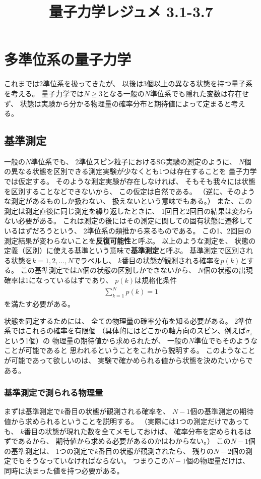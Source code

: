 \documentclass[a4paper, 10pt]{jsarticle}
\title{量子力学レジュメ 3.1-3.7}
\author{}
\begin{document}
\maketitle

\setcounter{section}{2}

\section{多準位系の量子力学}
これまでは2準位系を扱ってきたが、
以後は3個以上の異なる状態を持つ量子系を考える。
量子力学では$N \geq 3$となる一般の$N$準位系でも隠れた変数は存在せず、
状態は実験から分かる物理量の確率分布と期待値によって定まると考える。

\subsection{基準測定}
一般の$N$準位系でも、
2準位スピン粒子におけるSG実験の測定のように、
$N$個の異なる状態を区別できる測定実験が少なくとも1つは存在することを
量子力学では仮定する。
そのような測定実験が存在しなければ、
そもそも我々には状態を区別することなどできないから、
この仮定は自然である。
（逆に、そのような測定があるものしか扱わない、
扱えないという意味でもある。）
また、この測定は測定直後に同じ測定を繰り返したときに、
1回目と2回目の結果は変わらない必要がある。
これは測定の後にはその測定に関しての固有状態に遷移しているはずだろうという、
2準位系の類推から来るものである。
この1、2回目の測定結果が変わらないことを\textbf{反復可能性}と呼ぶ。
以上のような測定を、
状態の定義（区別）に使える基準という意味で\textbf{基準測定}と呼ぶ。
基準測定で区別される状態を$k = 1, 2, \dots, N$でラベルし、
$k$番目の状態が観測される確率を$p(k)$とする。
この基準測定では$N$個の状態の区別しかできないから、
$N$個の状態の出現確率は1になっているはずであり、
$p(k)$は規格化条件
\begin{align}
	\sum_{k=1}^N p(k) = 1
	\label{規格化条件}
\end{align}
を満たす必要がある。

状態を同定するためには、
全ての物理量の確率分布を知る必要がある。
2準位系ではこれらの確率を有限個
（具体的にはどこかの軸方向のスピン、例えば$\sigma_z$という1個）の
物理量の期待値から求められたが、
一般の$N$準位でもそのようなことが可能であると
思われるということをこれから説明する。
このようなことが可能であって欲しいのは、
実験で確かめられる値から状態を決めたいからである。

\subsubsection{基準測定で測られる物理量}
まずは基準測定で$k$番目の状態が観測される確率を、
$N-1$個の基準測定の期待値から求められるということを説明する。
（実際には1つの測定だけであっても、
$k$番目の状態が現れた数を全てメモしておけば、
確率分布を定められるはずであるから、
期待値から求める必要があるのかはわからない。）
この$N-1$個の基準測定は、
1つの測定で$k$番目の状態が観測されたら、
残りの$N-2$個の測定でもそうなっていなければならない。
つまりこの$N-1$個の物理量だけは、
同時に決まった値を持つ必要がある。
\end{document}
